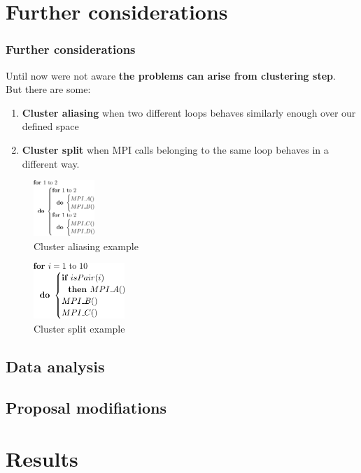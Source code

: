 \documentclass{beamer}
\begin{document}
\section{Further considerations}
\begin{frame}
\frametitle{Further considerations}

Until now were not aware \textbf{the problems can arise from clustering step}. \\
But there are some:
\begin{enumerate}
	\item \textbf{Cluster aliasing} when two different loops behaves similarly enough over our defined space
	\item \textbf{Cluster split} when MPI calls belonging to the same loop behaves in a different way.
\end{enumerate}
\vfill
\pause
\begin{multicols}{2}
	\begin{figure}
		\includegraphics[height=80px]{imgs/aliasing_example.png}
		\caption{Cluster aliasing example}
	\end{figure}
	\columnbreak
	\begin{figure}
		\includegraphics[height=80px]{imgs/split_example.png}
		\caption{Cluster split example}
	\end{figure}
\end{multicols}
\end{frame}

\subsection{Data analysis}

\subsection{Proposal modifiations}

\section{Results}
\end{document}
